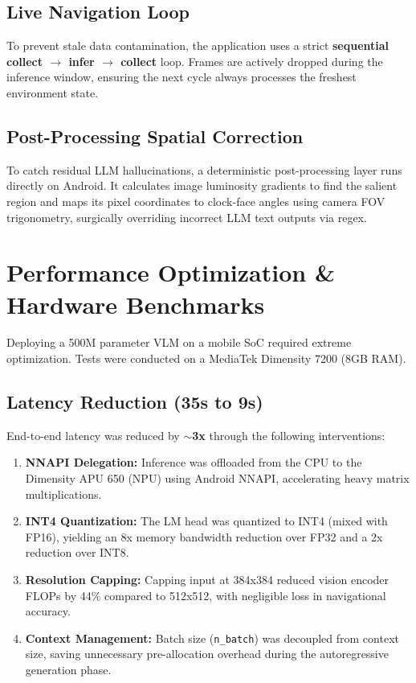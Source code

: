 \documentclass[11pt,a4paper]{article}
\begin{document}
\subsection{Live Navigation Loop}
To prevent stale data contamination, the application uses a strict \textbf{sequential collect $\rightarrow$ infer $\rightarrow$ collect} loop. Frames are actively dropped during the inference window, ensuring the next cycle always processes the freshest environment state.

\subsection{Post-Processing Spatial Correction}
To catch residual LLM hallucinations, a deterministic post-processing layer runs directly on Android. It calculates image luminosity gradients to find the salient region and maps its pixel coordinates to clock-face angles using camera FOV trigonometry, surgically overriding incorrect LLM text outputs via regex.

\section{Performance Optimization \& Hardware Benchmarks}

Deploying a 500M parameter VLM on a mobile SoC required extreme optimization. Tests were conducted on a MediaTek Dimensity 7200 (8GB RAM).

\subsection{Latency Reduction (35s to 9s)}
End-to-end latency was reduced by \textbf{$\sim$3x} through the following interventions:
\begin{enumerate}
    \item \textbf{NNAPI Delegation:} Inference was offloaded from the CPU to the Dimensity APU 650 (NPU) using Android NNAPI, accelerating heavy matrix multiplications.
    \item \textbf{INT4 Quantization:} The LM head was quantized to INT4 (mixed with FP16), yielding an 8x memory bandwidth reduction over FP32 and a 2x reduction over INT8.
    \item \textbf{Resolution Capping:} Capping input at 384x384 reduced vision encoder FLOPs by 44\% compared to 512x512, with negligible loss in navigational accuracy.
    \item \textbf{Context Management:} Batch size (\texttt{n\_batch}) was decoupled from context size, saving unnecessary pre-allocation overhead during the autoregressive generation phase.
\end{enumerate}
\end{document}
